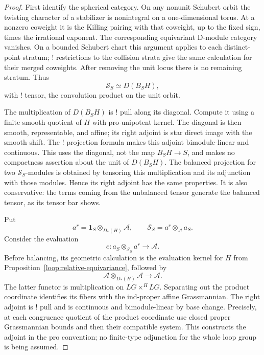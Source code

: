 \documentclass[11pt]{article}
\numberwithin{equation}{section}
\theoremstyle{definition}
\theoremstyle{remark}
\begin{document}
\begin{proof}
First identify the spherical category.  On any nonunit Schubert
orbit the twisting character of a stabilizer is nonintegral on
a one-dimensional torus.  At a nonzero coweight it is the
Killing pairing with that coweight, up to the fixed sign, times
the irrational exponent.  The corresponding equivariant
D-module category vanishes.  On a bounded Schubert chart this
argument applies to each distinct-point stratum; ! restrictions
to the collision strata give the same calculation for their
merged coweights.  After removing the unit locus there is no
remaining stratum.  Thus
\[
                         \mathcal S_S\simeq D(B_SH),
\]
with ! tensor, the convolution product on the unit orbit.

The multiplication of $D(B_SH)$ is ! pull along its diagonal.
Compute it using a finite smooth quotient of $H$ with
pro-unipotent kernel.  The diagonal is then smooth,
representable, and affine; its right adjoint is star direct
image with the smooth shift.  The ! projection formula makes
this adjoint bimodule-linear and continuous.  This uses the diagonal,
not the map $B_SH\to S$, and makes no compactness assertion about
the unit of $D(B_SH)$.  The balanced
projection for two $\mathcal S_S$-modules is obtained by
tensoring this multiplication and its adjunction with those
modules.  Hence its right adjoint has the same properties.
It is also conservative: the terms coming from the unbalanced
tensor generate the balanced tensor, as its tensor bar shows.

Put
\[
        a^r=\mathbf1_S\otimes_{D_*(H)}\mathcal A,
        \qquad
        \mathcal S_S=a^r\otimes_{\mathcal A}a_S.
\]
Consider the evaluation
\[
             e:a_S\otimes_{\mathcal S_S}a^r\longrightarrow\mathcal A.
\]
Before balancing, its geometric calculation is the evaluation
kernel for $H$ from Proposition~\ref{loop:relative-equivariance},
followed by
\[
             \mathcal A\otimes_{D_*(H)}\mathcal A
                            \longrightarrow\mathcal A.
\]
The latter functor is multiplication on $LG\times^H LG$.
Separating out the product coordinate identifies its fibers
with the ind-proper affine Grassmannian.  The right adjoint is
! pull and is continuous and bimodule-linear by base change.
Precisely, at each congruence quotient of the product coordinate
use closed proper Grassmannian bounds and then their compatible
system.  This constructs the adjoint in the pro convention;
no finite-type adjunction for the whole loop group is being
assumed.


\end{proof}
\end{document}
